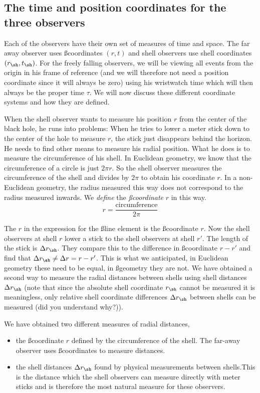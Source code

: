 {\begin{multicols}{2}
\section{The time and position coordinates for the three observers}
\label{sect:coordinates}

Each of the observers have their own set of measures of time and space. The far away observer uses \ss coordinates $(r,t)$ and shell observers use shell coordinates $(r_\sh,t_\sh)$. For the freely falling observers, we will be viewing all events from the origin in his frame of reference (and we will therefore not need a position coordinate since it will always be zero) using his wristwatch time which will then always be the proper time $\tau$. We will now discuss these different coordinate systems and how they are defined.


When the shell observer wants to measure his position $r$ from the center of the black hole, he runs into problems: When he tries to lower a meter stick down to the center of the hole to measure $r$, the stick just disappears behind the horizon. He needs to find other means to measure his radial position. What he does is to measure the circumference of his shell. In Euclidean geometry, we know that the circumference of a circle is just $2\pi r$. So the shell observer measures the circumference of the shell and divides by $2\pi$ to obtain his coordinate $r$. In a non-Euclidean geometry, the radius measured this way does not correspond to the radius measured inwards. We \emph{define} the {\it \ss coordinate} $r$ in this way. 
\[
r=\frac{\mathrm{circumference}}{2\pi}
\]

The $r$ in the expression for the \ss line element is the \ss coordinate $r$. Now the shell observers at shell $r$ lower a stick to the shell observers at shell $r'$. The length of the stick is $\Delta r_\sh$. They compare this to the difference in \ss coordinate $r-r'$ and find that $\Delta r_\sh\ne\Delta r=r-r'$. This is what we anticipated, in Euclidean geometry these need to be equal, in \ss geometry they are not. We have obtained a second way to measure the radial distances between shells using shell distances $\Delta r_\sh$ (note that since the absolute shell coordinate $r_\sh$ cannot be measured it is meaningless, only relative shell coordinate differences $\Delta r_\sh$ between shells can be measured (did you understand why?)).

We have obtained two different measures of radial distances, 
\begin{itemize}
\item the \ss coordinate $r$ defined by the circumference of the shell. The far-away observer uses \ss coordinates to measure distances.
\item the shell distances $\Delta r_\sh$ found by physical measurements between shells.This is the distance which the shell observers can measure directly with meter sticks and is therefore the most natural measure for these observers.
\end{itemize}


\end{multicols}}
